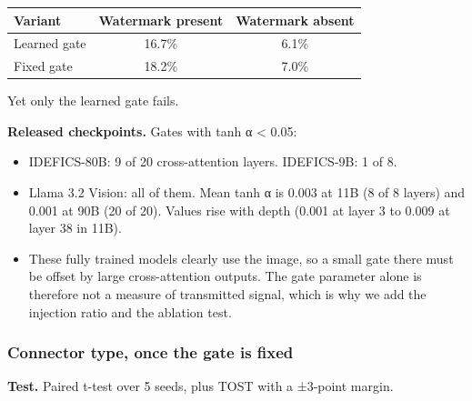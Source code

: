 {\def\LTcaptype{none} %
\begin{longtable}[]{@{}lcc@{}}
\toprule\noalign{}
Variant & Watermark present & Watermark absent \\
\midrule\noalign{}
\endhead
\bottomrule\noalign{}
\endlastfoot
Learned gate & 16.7\% & 6.1\% \\
Fixed gate & 18.2\% & 7.0\% \\
\end{longtable}
}

Yet only the learned gate fails.

\textbf{Released checkpoints.} Gates with \textbar tanh α\textbar{} \textless{} 0.05:

\begin{itemize}
\item
  IDEFICS-80B: 9 of 20 cross-attention layers. IDEFICS-9B: 1 of 8.
\item
  Llama 3.2 Vision: all of them. Mean \textbar tanh α\textbar{} is 0.003 at 11B (8 of 8 layers) and 0.001 at 90B (20 of 20).
  Values rise with depth (0.001 at layer 3 to 0.009 at layer 38 in 11B).
\item
  These fully trained models clearly use the image, so a small gate there must be offset by large
  cross-attention outputs. The gate parameter alone is therefore not a measure of transmitted signal, which is
  why we add the injection ratio and the ablation test.
\end{itemize}

\subsubsection{Connector type, once the gate is fixed}

\textbf{Test.} Paired t-test over 5 seeds, plus TOST with a ±3-point margin.

